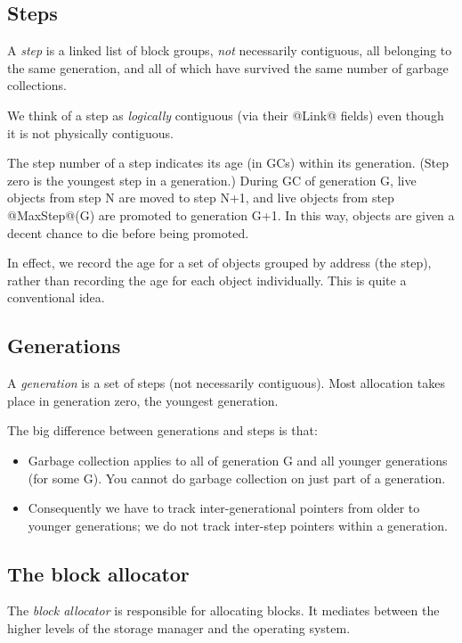 \documentclass{article}
\newcommand{\block}{block}
\newcommand{\step}{step}
\newcommand{\Step}{Step}
\begin{document}
\subsection{\Step{}s}

A {\em \step} is a linked list of \block{} groups, {\em not} necessarily contiguous,
all belonging to the same generation,
and all of which have survived the same number of garbage collections.

We think of a \step{} as {\em logically} contiguous (via their @Link@ fields) even though
it is not physically contiguous.

The \step{} number of a \step{} indicates its age (in GCs) within its generation.
(\Step{} zero is the youngest \step{} in a generation.)  During GC of generation G, 
live objects
from \step{} N are moved to \step{} N+1, and live objects from \step{} @MaxStep@(G)
are promoted to generation G+1. In this way, objects are given a decent chance
to die before being promoted.  

In effect, we record the age for a set of objects grouped by address (the \step{}), 
rather than recording the age for each object individually.  This is quite
a conventional idea.

\subsection{Generations}

A {\em generation} is a set of \step{}s 
(not necessarily contiguous).  Most allocation takes 
place in generation zero, the youngest generation.

The big difference between generations and \step{}s is that:
\begin{itemize}
\item Garbage collection applies to all of generation G and all younger
  generations (for some G).  You cannot do garbage collection on just
  part of a generation.

\item Consequently we have to track inter-generational pointers from
older to younger generations; we do not
  track inter-\step{} pointers within a generation.
\end{itemize}

\subsection{The \block{} allocator}

The {\em \block{} allocator} is responsible for
allocating blocks.  It mediates between the higher levels of the
storage manager and the operating system.
\end{document}
